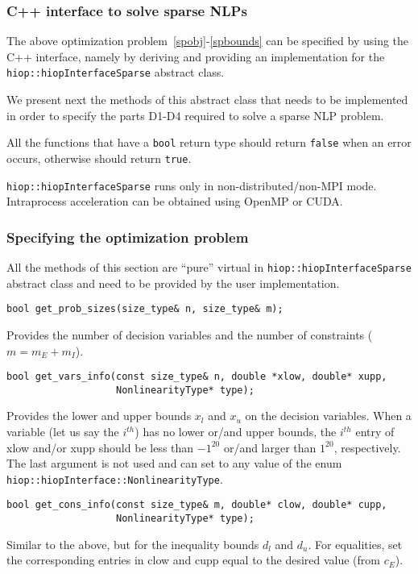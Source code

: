 \subsubsection{C++ interface to solve sparse NLPs}
The above optimization problem~\eqref{spobj}-\eqref{spbounds} can be specified by using the C++ interface, namely by deriving and providing an implementation for the \texttt{hiop::hiopInterfaceSparse} abstract class.

 We present next the methods of this abstract class that needs to be implemented in order to specify the parts D1-D4 required to solve a sparse NLP  problem. 

 All the functions that have a \texttt{bool} return type should return \texttt{false} when an error occurs, otherwise should return \texttt{true}.

 \texttt{hiop::hiopInterfaceSparse} runs only in non-distributed/non-MPI mode. Intraprocess acceleration can be obtained using OpenMP or CUDA.

\subsubsection{Specifying the optimization problem}

All the methods of this section are ``pure'' virtual in \texttt{hiop::hiopInterfaceSparse} abstract class  and need to be provided by the user implementation.

\begin{lstlisting} 
bool get_prob_sizes(size_type& n, size_type& m);
\end{lstlisting} 
\noindent Provides the number of decision variables and the number of constraints ($m=m_E+m_I$).


\begin{lstlisting} 
bool get_vars_info(const size_type& n, double *xlow, double* xupp, 
                   NonlinearityType* type);
\end{lstlisting} 

\noindent Provides the lower and upper bounds $x_l$ and $x_u$ on the decision variables. When a variable (let us say the $i^{th}$) has no lower or/and upper bounds, the  $i^{th}$ entry of xlow and/or xupp should be less than $-1^{20}$ or/and larger than $1^{20}$, respectively. The last argument is not used and can set to any value of the enum \texttt{hiop::hiopInterface::NonlinearityType}.

\begin{lstlisting} 
bool get_cons_info(const size_type& m, double* clow, double* cupp, 
                   NonlinearityType* type);
\end{lstlisting}
\noindent Similar to the above, but for the inequality bounds $d_l$ and $d_u$. For equalities, set the corresponding entries in clow and cupp equal to the desired value (from $c_E$).


